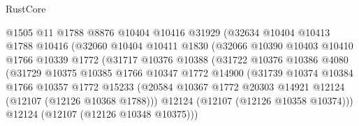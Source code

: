 \begin{lexlean}{RustCore}
\begin{coremodule}
                                @1505
                                @11
                                @1788
                                @8876
                                @10404
                                @10416
                                @31929
                                (@32634
                                  @10404
                                  @10413
                                  @1788
                                  @10416
                                  (@32060
                                    @10404
                                    @10411
                                    @1830
                                    (@32066
                                      @10390
                                      @10403
                                      @10410
                                      @1766
                                      @10339
                                      @1772
                                      (@31717
                                        @10376
                                        @10388
                                        (@31722
                                          @10376
                                          @10386
                                          @4080
                                          (@31729
                                            @10375
                                            @10385
                                            @1766
                                            @10347
                                            @1772
                                            @14900
                                            (@31739
                                              @10374
                                              @10384
                                              @1766
                                              @10357
                                              @1772
                                              @15233
                                              (@20584
                                                @10367
                                                @1772
                                                @20303
                                                @14921
                                                @12124
                                                (@12107 (@12126 @10368 @1788)))
                                              @12124
                                              (@12107 (@12126 @10358 @10374)))
                                            @12124
                                            (@12107 (@12126 @10348 @10375)))

\end{coremodule}
\end{lexlean}

